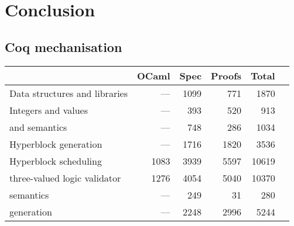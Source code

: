 \chapter{Conclusion}%
\label{sec:conclusion}

\section{Coq mechanisation}

\begin{table}
  \centering
  \label{tab:proof_statistics}
  \begin{tabular}{lrrrrr}
    \toprule
    & \textbf{OCaml} & \textbf{Spec} & \textbf{Proofs} & \textbf{Total}\\
    \midrule
    {Data structures and libraries}       & --- & 1099 &  771 &  1870 \\
    {Integers and values}                 & --- &  393 &  520 &   913 \\
    {\rtlblock{} and \rtlpar{} semantics} &  --- & 748 &  286 &  1034 \\
    {Hyperblock generation}               &  --- & 1716 & 1820 &  3536 \\
    {Hyperblock scheduling}               & 1083 & 3939 & 5597 & 10619 \\
    {three-valued logic validator}            & 1276 & 4054 & 5040 & 10370 \\
    {\htl{} semantics}                    &  --- &  249 &   31 &   280 \\
    {\htl{} generation}                   &  --- & 2248 & 2996 &  5244 \\

\end{tabular}
\end{table}
